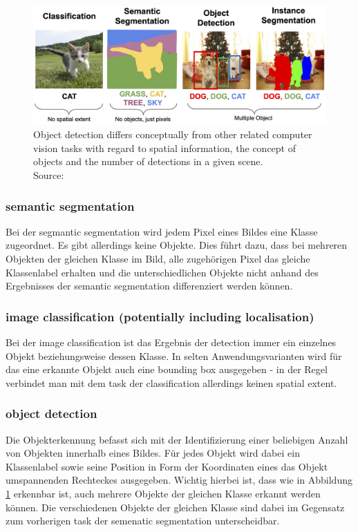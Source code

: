 \documentclass[
			   fontsize=11pt,
               paper=a4,
               bibliography=totoc,
               idxtotoc,
               headsepline,
               footsepline,
               footinclude=false,
               BCOR=12mm,
               DIV=13,
               openany,   %
               ]
               {scrbook}
\begin{document}
\begin{figure}[H] %
	\centering
	\includegraphics[width=\textwidth]{figures/detection_related_tasks.png}
	\caption[Typical Computer Vision Tasks]{Object detection differs conceptually from other related computer vision tasks with regard to spatial information, the concept of objects and the number of detections in a given scene.\\
		\tiny{Source:~\cite{cvTasks}}}
	\label{fig:cvTasks} %
\end{figure}

\subsubsection{semantic segmentation}
Bei der segmantic segmentation wird jedem Pixel eines Bildes eine Klasse zugeordnet. Es gibt allerdings keine Objekte. Dies führt dazu, dass bei mehreren Objekten der gleichen Klasse im Bild, alle zugehörigen Pixel das gleiche Klassenlabel erhalten und die unterschiedlichen Objekte nicht anhand des Ergebnisses der semantic segmentation differenziert werden können.

\subsubsection{image classification (potentially including localisation)}
Bei der image classification ist das Ergebnis der detection immer ein einzelnes Objekt beziehungsweise dessen Klasse. In selten Anwendungsvarianten wird für das eine erkannte Objekt auch eine bounding box ausgegeben - in der Regel verbindet man mit dem task der classification allerdings keinen spatial extent.

\subsubsection{object detection}
Die Objekterkennung befasst sich mit der Identifizierung einer beliebigen Anzahl von Objekten innerhalb eines Bildes. Für jedes Objekt wird dabei ein Klassenlabel sowie seine Position in Form der Koordinaten eines das Objekt umspannenden Rechteckes ausgegeben. Wichtig hierbei ist, dass wie in Abbildung \ref{fig:cvTasks} erkennbar ist, auch mehrere Objekte der gleichen Klasse erkannt werden können. Die verschiedenen Objekte der gleichen Klasse sind dabei im Gegensatz zum vorherigen task der semenatic segmentation unterscheidbar.
\end{document}
